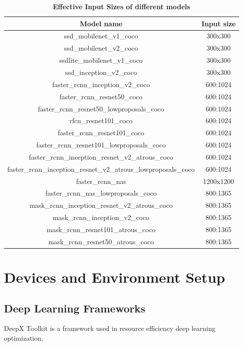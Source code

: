 \documentclass[conference]{IEEEtran}
\begin{document}
\begin{table}
\caption{\textbf{Effective Input Sizes of different models}}
\begin{tabular}{ c | c  }
Model name & Input size \\
\hline
ssd\_mobilenet\_v1\_coco & 300x300  \\
ssd\_mobilenet\_v2\_coco & 300x300  \\
ssdlite\_mobilenet\_v1\_coco & 300x300 \\
ssd\_inception\_v2\_coco & 300x300 \\
faster\_rcnn\_inception\_v2\_coco & 600:1024  \\
faster\_rcnn\_resnet50\_coco & 600:1024  \\
faster\_rcnn\_resnet50\_lowproposals\_coco & 600:1024 \\
rfcn\_resnet101\_coco & 600:1024\\
faster\_rcnn\_resnet101\_coco & 600:1024\\
faster\_rcnn\_resnet101\_lowproposals\_coco &  600:1024\\
faster\_rcnn\_inception\_resnet\_v2\_atrous\_coco	 &  600:1024\\
faster\_rcnn\_inception\_resnet\_v2\_atrous\_lowproposals\_coco & 600:1024\\
faster\_rcnn\_nas	&  1200x1200\\
faster\_rcnn\_nas\_lowproposals\_coco &  800:1365\\
mask\_rcnn\_inception\_resnet\_v2\_atrous\_coco & 800:1365 \\
mask\_rcnn\_inception\_v2\_coco	&  800:1365\\
mask\_rcnn\_resnet101\_atrous\_coco	&  800:1365\\
mask\_rcnn\_resnet50\_atrous\_coco &  800:1365\\
\end{tabular}
\label{tab:model_input_size}
\end{table}

\section{Devices and Environment Setup}

\subsection{Deep Learning Frameworks}
DeepX Toolkit is a framework used in resource efficiency deep learning optimization.
\end{document}
